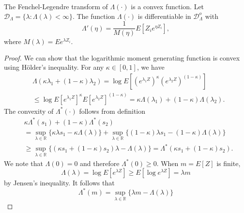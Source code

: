 \begin{lemma} \label{lemma:PropertiesLambdaStar}
The Fenchel-Legendre transform of $\Lambda(\cdot)$ is a convex function.
Let $\mathcal{D}_{\Lambda} = \{ \lambda : \Lambda (\lambda) < \infty \}$.
The function $\Lambda (\cdot)$ is differentiable in $\mathcal{D}_{\Lambda}^o$ with
\begin{equation} \label{equation:DerivativeLambda}
\Lambda' (\eta) = \frac{1}{M(\eta)} E \left[ Z_i e^{\eta Z_i} \right] ,
\end{equation}
where $M (\lambda) = E e^{\lambda Z_i}$.
\end{lemma}
\begin{proof}
We can show that the logarithmic moment generating function is convex using H\"older's inequality.
For any $\kappa \in [0,1]$, we have
\begin{equation*}
\begin{split}
&\Lambda (\kappa \lambda_1 + (1 - \kappa) \lambda_2)
= \log E \left[ \left( e^{\lambda_1 Z} \right)^{\kappa}
\left( e^{\lambda_2 Z} \right)^{(1 - \kappa)} \right] \\
&\leq \log E \left[ e^{\lambda_1 Z} \right]^{\kappa}
E \left[ e^{\lambda_2 Z} \right]^{(1 - \kappa)}
= \kappa \Lambda(\lambda_1) + (1 - \kappa) \Lambda(\lambda_2) .
\end{split}
\end{equation*}
The convexity of $\Lambda^* (\cdot)$ follows from definition
\begin{equation*}
\begin{split}
&\kappa \Lambda^* (s_1) + (1 - \kappa) \Lambda^* (s_2) \\
&= \sup_{\lambda \in \mathbb{R}} \{ \kappa \lambda s_1 - \kappa \Lambda(\lambda) \}
+ \sup_{\lambda \in \mathbb{R}}
\{ (1 - \kappa) \lambda s_1 - (1 - \kappa) \Lambda(\lambda) \} \\
&\geq \sup_{\lambda \in \mathbb{R}} \{ (\kappa s_1 + (1 - \kappa) s_2) \lambda
- \Lambda(\lambda) \}
= \Lambda^* (\kappa s_1 + (1 - \kappa) s_2) .
\end{split}
\end{equation*}
We note that $\Lambda(0) = 0$ and therefore $\Lambda^*(0) \geq 0$.
When $m = E[Z]$ is finite,
\begin{equation*}
\Lambda(\lambda) = \log E \left[ e^{\lambda Z} \right]
\geq E \left[ \log e^{\lambda Z} \right] = \lambda m
\end{equation*}
by Jensen's inequality.
It follows that
\begin{equation*}
\Lambda^* (m) = \sup_{\lambda \in \mathbb{R}} \{ \lambda m - \Lambda(\lambda) \}

\end{equation*}
\end{proof}
